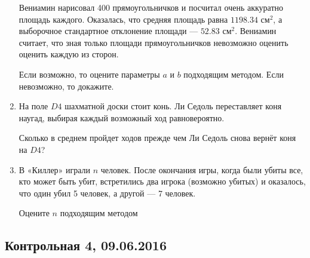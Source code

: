\documentclass[12pt, a4paper]{article}\usepackage[]{graphicx}\usepackage[]{color}
\begin{document}
\begin{enumerate}
Вениамин нарисовал 400 прямоугольничков и посчитал очень аккуратно площадь каждого. Оказалась, что средняя площадь равна $1198.34$ см$^2$, а выборочное стандартное отклонение площади — $52.83$ см$^2$. Вениамин считает, что зная только площади прямоугольничков невозможно оценить оценить каждую из сторон.

Если возможно, то оцените параметры $a$ и $b$ подходящим методом. Если невозможно, то докажите.


\item На поле $D4$ шахматной доски стоит конь. Ли Седоль переставляет коня наугад, выбирая каждый возможный ход равновероятно.

Сколько в среднем пройдет ходов прежде чем Ли Седоль снова вернёт коня на $D4$?



\item В «Киллер» играли $n$ человек. После окончания игры, когда были убиты все, кто может быть убит, встретились два игрока (возможно убитых) и оказалось, что один убил 5 человек, а другой — 7 человек.

Оцените $n$ подходящим методом
\end{enumerate}



\subsection{Контрольная 4, 09.06.2016}
\end{document}
